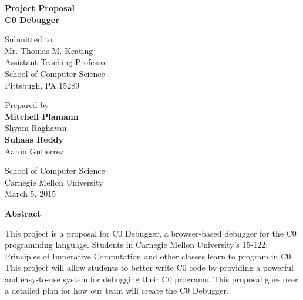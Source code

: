 \documentclass[11pt]{article}
\begin{document}
\setlength{\parindent}{2em}



\begin{titlepage}
\clearpage
\thispagestyle{empty}

\begin{center}
{\bf Project Proposal}\\
\vspace{10 mm}
{\bf C0 Debugger}\\
\vspace{10 mm}

Submitted to\\
Mr. Thomas M. Keating\\
Assistant Teaching Professor\\
School of Computer Science\\
Pittsbugh, PA 15289

\vspace{10 mm}

Prepared by\\
{\bf Mitchell Plamann}\\
Shyam Raghavan\\
{\bf Suhaas Reddy}\\
Aaron Gutierrez

\vspace{10 mm}

School of Computer Science\\
Carnegie Mellon University\\
March 5, 2015

\vspace{10 mm}

{\bf Abstract}
\end{center}
\par
This project is a proposal for C0 Debugger, a browser-based debugger for the
C0 programming language.
Students in Carnegie Mellon University's 15-122: Principles of Imperative
Computation and other classes learn to program in C0.
This project will allow students to better write C0 code by providing a 
powerful and easy-to-use system for debugging their C0 programs.
This proposal goes over a detailed plan for how our team will create the C0 Debugger.
\end{titlepage}

\tableofcontents
\newpage

\end{document}
